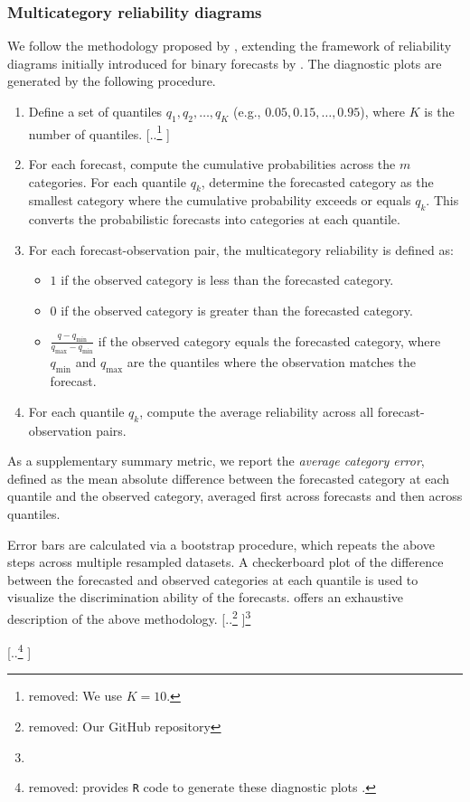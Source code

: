 \documentclass{article}
\providecommand{\DIFadd}[1]{{\protect\color{blue} \sf #1}} %
\providecommand{\DIFdel}[1]{{\protect\color{red} [..\footnote{removed: #1} ]}} %
\providecommand{\DIFaddend}{} %
\providecommand{\DIFdelbegin}{} %
\providecommand{\DIFdelend}{} %
\begin{document}
\subsubsection{\DIFadd{Multicategory reliability diagrams}}
\DIFaddend We follow the methodology proposed by \citet{hamill1997}, extending the framework of reliability diagrams initially introduced for binary forecasts by \citet{wilks1995a}.
The diagnostic plots are generated by the following procedure.
\begin{enumerate}    
    \item Define a set of quantiles $q_1, q_2, \dots, q_K$ (e.g., $0.05, 0.15, \dots, 0.95$), where $K$ is the number of quantiles.
    \DIFdelbegin \DIFdel{We use $K = 10$.
    }\DIFdelend \item For each forecast, compute the cumulative probabilities across the $m$ categories. For each quantile $q_k$, determine the forecasted category as the smallest category where the cumulative probability exceeds or equals $q_k$. This converts the probabilistic forecasts into categories at each quantile.
    \item For each forecast-observation pair, the multicategory reliability is defined as:
    \begin{itemize}
        \item $1$ if the observed category is less than the forecasted category.
        \item $0$ if the observed category is greater than the forecasted category.
        \item $\frac{q - q_{\min}}{q_{\max} - q_{\min}}$ if the observed category equals the forecasted category, where $q_{\min}$ and $q_{\max}$ are the quantiles where the observation matches the forecast.
    \end{itemize}
    \item For each quantile $q_k$, compute the average reliability across all forecast-observation pairs.
\end{enumerate}
As a supplementary summary metric, we report the \textit{average category error}, defined as the mean absolute difference between the forecasted category at each quantile and the observed category, averaged first across forecasts and then across quantiles.

Error bars are calculated via a bootstrap procedure, which repeats the above steps across multiple resampled datasets. A checkerboard plot of the difference between the forecasted and observed categories at each quantile is used to visualize the discrimination ability of the forecasts. \citet{hamill1997} offers an exhaustive description of the above methodology.
\DIFdelbegin \DIFdel{Our GitHub repository}\footnote{%
} %
\addtocounter{footnote}{-1}%
\DIFdel{provides \texttt{R} code to generate these diagnostic plots .
}%
\DIFdelend 
\end{document}
